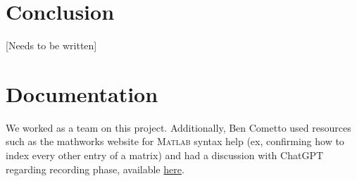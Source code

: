 
\section{Conclusion}
[Needs to be written]



\section*{Documentation}
We worked as a team on this project.  Additionally, Ben Cometto used resources such as the mathworks website for \textsc{Matlab} syntax help (ex, confirming how to index every other entry of a matrix) and had a discussion with ChatGPT regarding recording phase, available \href{https://chatgpt.com/c/673ff615-bf94-800b-a437-6f861b769c24}{here}.